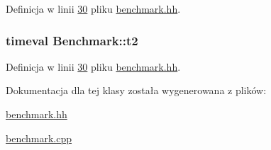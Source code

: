 Definicja w linii \hyperlink{benchmark_8hh_source_l00030}{30} pliku \hyperlink{benchmark_8hh_source}{benchmark.\-hh}.

\hypertarget{class_benchmark_a2b145dd2458fea33d6df41f310058bec}{
\subsubsection[{t2}]{\setlength{\rightskip}{0pt plus 5cm}timeval Benchmark\-::t2\hspace{0.3cm}{\ttfamily [private]}}}\label{class_benchmark_a2b145dd2458fea33d6df41f310058bec}


Definicja w linii \hyperlink{benchmark_8hh_source_l00030}{30} pliku \hyperlink{benchmark_8hh_source}{benchmark.\-hh}.



Dokumentacja dla tej klasy została wygenerowana z plików\-:\begin{DoxyCompactItemize}
\item 
\hyperlink{benchmark_8hh}{benchmark.\-hh}\item 
\hyperlink{benchmark_8cpp}{benchmark.\-cpp}\end{DoxyCompactItemize}
